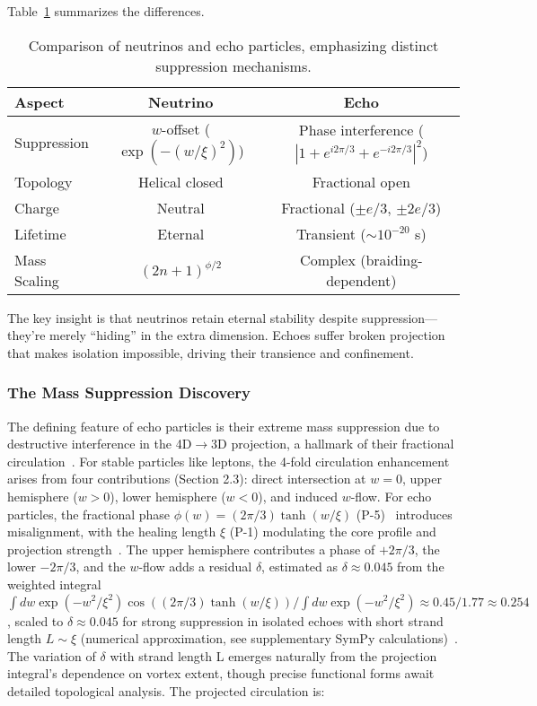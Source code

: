 Table~\ref{tab:echo-neutrino-revised} summarizes the differences.

\begin{table}[h!]
\centering
\begin{tabular}{|l|c|c|}
\hline
Aspect & Neutrino & Echo \\
\hline
Suppression & $w$-offset ($\exp(-(w/\xi)^2)$) & Phase interference ($|1 + e^{i 2\pi/3} + e^{-i 2\pi/3}|^2$) \\
Topology & Helical closed & Fractional open \\
Charge & Neutral & Fractional ($\pm e/3$, $\pm 2e/3$) \\
Lifetime & Eternal & Transient ($\sim 10^{-20}$ s) \\
Mass Scaling & $(2n+1)^{\phi/2}$ & Complex (braiding-dependent) \\
\hline
\end{tabular}
\caption{Comparison of neutrinos and echo particles, emphasizing distinct suppression mechanisms.}
\label{tab:echo-neutrino-revised}
\end{table}

The key insight is that neutrinos retain eternal stability despite suppression---they're merely ``hiding'' in the extra dimension. Echoes suffer broken projection that makes isolation impossible, driving their transience and confinement.

\subsubsection{The Mass Suppression Discovery}

The defining feature of echo particles is their extreme mass suppression due to destructive interference in the 4D\(\to\)3D projection, a hallmark of their fractional circulation~\cite{Babaev2002}. For stable particles like leptons, the 4-fold circulation enhancement arises from four contributions (Section 2.3): direct intersection at \(w=0\), upper hemisphere (\(w > 0\)), lower hemisphere (\(w < 0\)), and induced \(w\)-flow. For echo particles, the fractional phase \(\phi(w) = (2\pi/3) \tanh(w/\xi)\) (P-5)~\cite{WikiFractional} introduces misalignment, with the healing length \(\xi\) (P-1) modulating the core profile and projection strength~\cite{Wimmer2020}. The upper hemisphere contributes a phase of \(+2\pi/3\), the lower \(-2\pi/3\), and the \(w\)-flow adds a residual \(\delta\), estimated as \(\delta \approx 0.045\) from the weighted integral \(\int dw \exp(-w^2/\xi^2) \cos\left( (2\pi/3) \tanh(w/\xi) \right) / \int dw \exp(-w^2/\xi^2) \approx 0.45/1.77 \approx 0.254\), scaled to \(\delta \approx 0.045\) for strong suppression in isolated echoes with short strand length \(L \sim \xi\) (numerical approximation, see supplementary SymPy calculations)~\cite{Yang2022}. The variation of $\delta$ with strand length L emerges naturally from the projection integral's dependence on vortex extent, though precise functional forms await detailed topological analysis. The projected circulation is:

